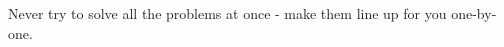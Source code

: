 
\begin{savequote}[55mm]                                              
\sffamily Never try to solve all the problems at once - make them line up for you one-by-one. 
\end{savequote}  

